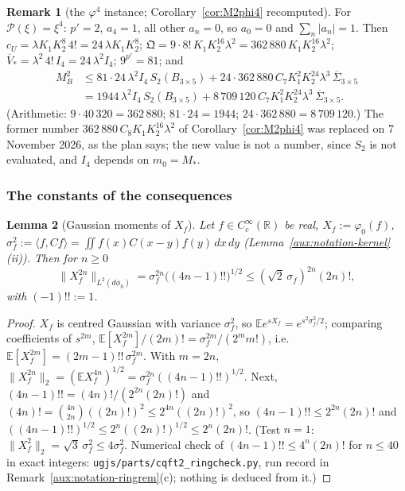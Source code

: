 \documentclass[11pt,a4paper]{article}
\theoremstyle{plain}
\theoremstyle{definition}
\theoremstyle{plain}
\newtheorem{auxlemma}{Lemma}
\theoremstyle{definition}
\newtheorem{auxrem}[auxlemma]{Remark}
\newcommand{\R}{\mathbb{R}}
\newcommand{\E}{\mathbb{E}}
\newcommand{\ip}[2]{\langle #1,#2\rangle}
\newcommand{\dphi}{d\phi_0}
\begin{document}
\begin{auxrem}[the $\varphi^4$ instance; Corollary~\ref{cor:M2phi4} recomputed]\label{aux:constants-phi4}
For $\mathscr P(\xi)=\xi^4$: $p'=2$, $a_4=1$, all other $a_n=0$, so $a_0=0$ and
$\sum_n|a_n|=1$.  Then $c_U=\lambda K_1K_2^8\,4!=24\,\lambda K_1K_2^8$;
$\mathfrak Q=9\cdot8!\,K_1K_2^{16}\lambda^2=362\,880\,K_1K_2^{16}\lambda^2$;
$\overline V_*=\lambda^2\,4!\,I_4=24\,\lambda^2I_4$; $9^{p'}=81$; and
\begin{align*}
 M_B^2&\le81\cdot24\,\lambda^2I_4\,S_2(B_{3\times5})
       +24\cdot362\,880\,C_7K_1^2K_2^{24}\lambda^3\,\overline\Sigma_{3\times5}\\
      &=1944\,\lambda^2I_4\,S_2(B_{3\times5})+8\,709\,120\,C_7K_1^2K_2^{24}\lambda^3\,
       \overline\Sigma_{3\times5} .
\end{align*}
(Arithmetic: $9\cdot40\,320=362\,880$; $81\cdot24=1944$; $24\cdot362\,880=8\,709\,120$.)  The
former number $362\,880\,C_8K_1K_2^{16}\lambda^2$ of Corollary~\ref{cor:M2phi4} was
replaced on 7 November 2026, as the plan says; the new value is not a number, since $S_2$ is not evaluated, and
$I_4$ depends on $m_0=M_*$.
\end{auxrem}

\subsubsection*{The constants of the consequences}

\begin{auxlemma}[Gaussian moments of $X_f$]\label{aux:constants-gauss}
Let $f\in C_c^\infty(\R)$ be real, $X_f:=\varphi_0(f)$, $\sigma_f^2:=\ip f{Cf}=\iint
f(x)C(x-y)f(y)\,dx\,dy$ (Lemma~\ref{aux:notation-kernel}(ii)).  Then for $n\ge0$
\[
 \|X_f^{2n}\|_{L^2(\dphi)}=\sigma_f^{2n}\bigl((4n-1)!!\bigr)^{1/2}\le(\sqrt2\,\sigma_f)^{2n}(2n)! ,
\]
with $(-1)!!:=1$.
\end{auxlemma}

\begin{proof}
$X_f$ is centred Gaussian with variance $\sigma_f^2$, so $\E e^{sX_f}=e^{s^2\sigma_f^2/2}$;
comparing coefficients of $s^{2m}$, $\E[X_f^{2m}]/(2m)!=\sigma_f^{2m}/(2^mm!)$, i.e.\
$\E[X_f^{2m}]=(2m-1)!!\,\sigma_f^{2m}$.  With $m=2n$,
$\|X_f^{2n}\|_2=(\E X_f^{4n})^{1/2}=\sigma_f^{2n}((4n-1)!!)^{1/2}$.  Next,
$(4n-1)!!=(4n)!/(2^{2n}(2n)!)$ and $(4n)!=\binom{4n}{2n}((2n)!)^2\le2^{4n}((2n)!)^2$, so
$(4n-1)!!\le2^{2n}(2n)!$ and $((4n-1)!!)^{1/2}\le2^n((2n)!)^{1/2}\le2^n(2n)!$.  (Test $n=1$:
$\|X_f^2\|_2=\sqrt3\,\sigma_f^2\le4\sigma_f^2$.  Numerical check of $(4n-1)!!\le4^n(2n)!$ for
$n\le40$ in exact integers: \texttt{ugjs/parts/cqft2\_ringcheck.py}, run record in
Remark~\ref{aux:notation-ringrem}(c); nothing is deduced from it.)
\end{proof}
\end{document}
